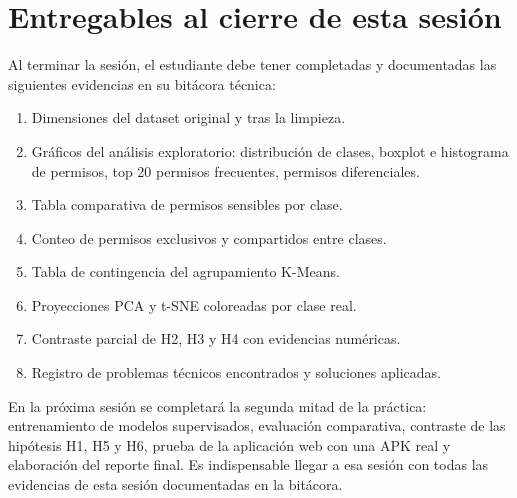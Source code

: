 \documentclass[
  coursetitle={Cómputo Nube y Tecnologías Emergentes},
  coursehours={96},
  coursedate={Verano 2026},
  doctype={Taller},
  otherlangs={english,french},
  authorname={Lázaro},
  authorsurname={Bustio-Martínez},
  authortitle={PhD},
  role={Profesor Investigador},
  email={lbustio@inaoe.mx},
  phone={5559504000},
  ext={7459},
  institution={Instituto Nacional de Astrofísica, Óptica y Electrónica (INAOE)},
  department={Maestría en Ciencias en Tecnologías de Seguridad},
  address={Luis Enrique Erro 1, Sta. Ma. Tonantzintla, San Andrés Cholula, CP 72840, Puebla, México},
  margin={0.5in}
]{../../lbustio_lecture_notes}
\begin{document}
\section{Entregables al cierre de esta sesión}

Al terminar la sesión, el estudiante debe tener completadas y documentadas las siguientes evidencias en su bitácora técnica:

\begin{enumerate}
    \item Dimensiones del dataset original y tras la limpieza.
    \item Gráficos del análisis exploratorio: distribución de clases, boxplot e histograma de permisos, top 20 permisos frecuentes, permisos diferenciales.
    \item Tabla comparativa de permisos sensibles por clase.
    \item Conteo de permisos exclusivos y compartidos entre clases.
    \item Tabla de contingencia del agrupamiento K-Means.
    \item Proyecciones PCA y t-SNE coloreadas por clase real.
    \item Contraste parcial de H2, H3 y H4 con evidencias numéricas.
    \item Registro de problemas técnicos encontrados y soluciones aplicadas.
\end{enumerate}

\begin{tcolorbox}[title=Avance hacia la sesión del 22/06]
En la próxima sesión se completará la segunda mitad de la práctica: entrenamiento de modelos supervisados, evaluación comparativa, contraste de las hipótesis H1, H5 y H6, prueba de la aplicación web con una APK real y elaboración del reporte final. Es indispensable llegar a esa sesión con todas las evidencias de esta sesión documentadas en la bitácora.
\end{tcolorbox}
\end{document}

